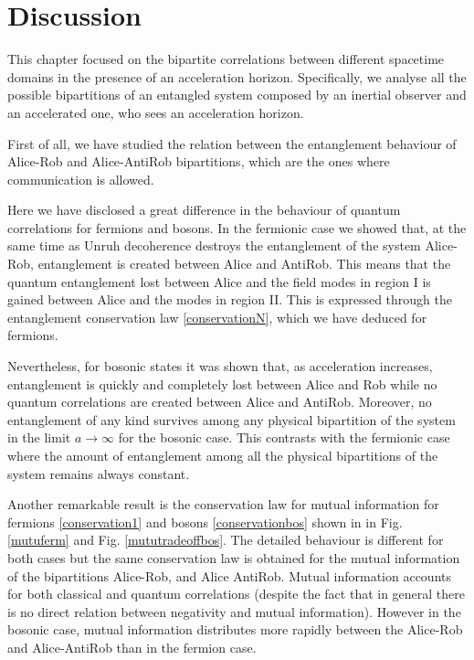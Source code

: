 \section{Discussion}\label{conclusions}

This chapter focused on the bipartite correlations between different spacetime domains in the presence of an acceleration horizon. Specifically, we analyse all the possible bipartitions of an entangled system composed by an inertial observer and an accelerated one, who sees an acceleration horizon.

First of all, we have studied the relation between the entanglement behaviour of Alice-Rob and Alice-AntiRob bipartitions, which are the ones where communication is allowed. 

Here we have disclosed a great difference in the behaviour of quantum correlations for fermions and bosons. In the fermionic case we showed that, at the same time as Unruh decoherence destroys the entanglement of the system Alice-Rob, entanglement is created between Alice and AntiRob. This means that the quantum entanglement lost between Alice and the field modes in region I is gained between Alice and the modes in region II. This is expressed through the entanglement conservation law \eqref{conservationN}, which we have deduced for fermions.

Nevertheless, for bosonic states it was shown that, as acceleration increases, entanglement is quickly and completely lost between Alice and Rob while no quantum correlations are created between Alice and AntiRob. Moreover, no entanglement of any kind survives among any physical bipartition of the system in the limit $a\rightarrow\infty$ for the bosonic case. This contrasts with the fermionic case where the amount of entanglement among all the physical bipartitions of the system remains always constant.

Another remarkable result is the conservation law for mutual information for fermions \eqref{conservation1} and bosons \eqref{conservationbos} shown in  in Fig. \ref{mutuferm} and Fig. \ref{mututradeoffbos}. The detailed  behaviour is different for both cases but the same conservation law is obtained for the mutual information of the bipartitions Alice-Rob, and Alice AntiRob. Mutual information accounts for both classical and quantum correlations (despite the fact that in general there is no direct relation between negativity and mutual information). However in the bosonic case, mutual information distributes more rapidly between the  Alice-Rob and Alice-AntiRob than in the fermion case.

